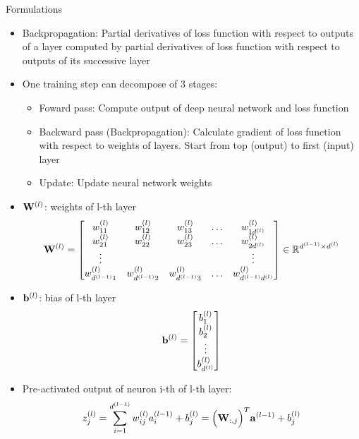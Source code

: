 \documentclass[10pt]{beamer}
\theoremstyle{remark}
\theoremstyle{definition}
\begin{document}
\begin{frame}[allowframebreaks]{Formulations}
	\begin{itemize}
		\item Backpropagation: Partial derivatives of loss function with respect to outputs of a layer computed by partial derivatives of loss function with respect to outputs of its successive layer
  		\item One training step can decompose of 3 stages:
		\begin{itemize}
			\item Foward pass: Compute output of deep neural network and loss function
   			\item Backward pass (Backpropagation): Calculate gradient of loss function with respect to weights of layers. Start from top (output) to first (input) layer
      		\item Update: Update neural network weights
		\end{itemize}
	\end{itemize}
	\framebreak
	\begin{itemize}
		\item $\bold{W}^{(l)}$: weights of l-th layer
    	\begin{equation*}
			\bold{W}^{(l)}=\begin{bmatrix} w_{11}^{(l)} & w_{12}^{(l)} & w_{13}^{(l)} & \dots & w_{1d^{(l)}}^{(l)} \\ w_{21}^{(l)} & w_{22}^{(l)} & w_{23}^{(l)} & \dots & w_{2d^{(l)}}^{(l)} \\ \vdots & \thickspace & \thickspace & \thickspace & \vdots \\ w_{d^{(l-1)}1}^{(l)} & w_{d^{(l-1)}2}^{(l)} & w_{d^{(l-1)}3}^{(l)} & \dots & w_{d^{(l-1)}d^{(l)}}^{(l)}\end{bmatrix} \in \mathbb{R}^{d^{(l-1)} \times d^{(l)}}
		\end{equation*}
		\item $\bold{b}^{(l)}$: bias of l-th layer
		\begin{equation*}
			\bold{b}^{(l)}=\begin{bmatrix} b_1^{(l)} \\  b_2^{(l)} \\ \vdots \\ b_{d^{(l)}}^{(l)} \end{bmatrix}
		\end{equation*}
		\item Pre-activated output of neuron i-th of l-th layer:
		\begin{equation}
			z_j^{(l)}=\sum_{i=1}^{d^{(l-1)}}w_{ij}^{(l)}a_i^{(l-1)}+b_j^{(l)}=\Big(\bold{W}_{:,j}\Big)^T \bold{a}^{(l-1)} + b_j^{(l)}

\end{equation}
\end{itemize}
\end{frame}
\end{document}

